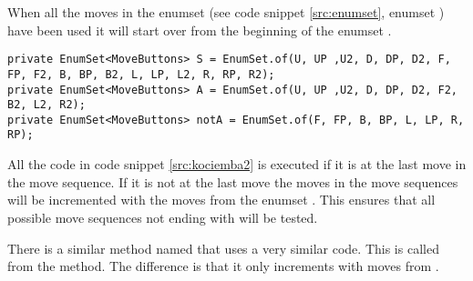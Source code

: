 When all the moves in the enumset  (see code snippet \ref{src:enumset}, enumset ) have been used it will start over from the beginning of the enumset .

\begin{lstlisting}[style=sourceCode, caption=\myCaption{The definition of the enumsets S, A, and notA.}, label=src:enumset]
private EnumSet<MoveButtons> S = EnumSet.of(U, UP ,U2, D, DP, D2, F, FP, F2, B, BP, B2, L, LP, L2, R, RP, R2);
private EnumSet<MoveButtons> A = EnumSet.of(U, UP ,U2, D, DP, D2, F2, B2, L2, R2);
private EnumSet<MoveButtons> notA = EnumSet.of(F, FP, B, BP, L, LP, R, RP);
\end{lstlisting}

All the code in code snippet \ref{src:kociemba2} is executed if it is at the last move in the move sequence.
If it is not at the last move the moves in the move sequences will be incremented with the moves from the enumset .
This ensures that all possible move sequences not ending with  will be tested.

There is a similar method named  that uses a very similar code.
This is called from the  method.
The difference is that it only increments with moves from .

